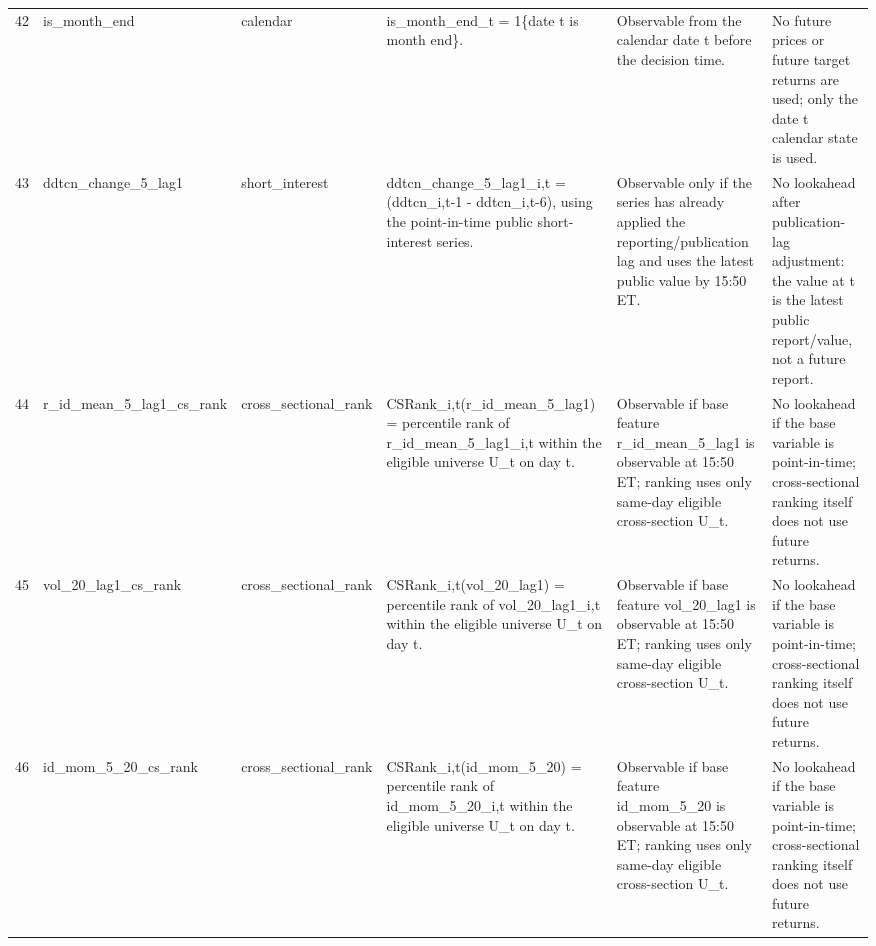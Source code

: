 \begin{landscape}
\begin{longtable}{P{0.42cm} P{2.25cm} P{2.05cm} P{5.25cm} P{4.85cm} P{5.25cm}}
42 & is\_\allowbreak{}month\_\allowbreak{}end & calendar & is\_\allowbreak{}month\_\allowbreak{}end\_\allowbreak{}t = 1\{date t is month end\}. & Observable from the calendar date t before the decision time. & No future prices or future target returns are used; only the date t calendar state is used. \\
43 & ddtcn\_\allowbreak{}change\_\allowbreak{}5\_\allowbreak{}lag1 & short\_\allowbreak{}interest & ddtcn\_\allowbreak{}change\_\allowbreak{}5\_\allowbreak{}lag1\_\allowbreak{}i,t = (ddtcn\_\allowbreak{}i,t-1 - ddtcn\_\allowbreak{}i,t-6), using the point-in-time public short-interest series. & Observable only if the series has already applied the reporting/publication lag and uses the latest public value by 15:50 ET. & No lookahead after publication-lag adjustment: the value at t is the latest public report/value, not a future report. \\
44 & r\_\allowbreak{}id\_\allowbreak{}mean\_\allowbreak{}5\_\allowbreak{}lag1\_\allowbreak{}cs\_\allowbreak{}rank & cross\_\allowbreak{}sectional\_\allowbreak{}rank & CSRank\_\allowbreak{}i,t(r\_\allowbreak{}id\_\allowbreak{}mean\_\allowbreak{}5\_\allowbreak{}lag1) = percentile rank of r\_\allowbreak{}id\_\allowbreak{}mean\_\allowbreak{}5\_\allowbreak{}lag1\_\allowbreak{}i,t within the eligible universe U\_\allowbreak{}t on day t. & Observable if base feature r\_\allowbreak{}id\_\allowbreak{}mean\_\allowbreak{}5\_\allowbreak{}lag1 is observable at 15:50 ET; ranking uses only same-day eligible cross-section U\_\allowbreak{}t. & No lookahead if the base variable is point-in-time; cross-sectional ranking itself does not use future returns. \\
45 & vol\_\allowbreak{}20\_\allowbreak{}lag1\_\allowbreak{}cs\_\allowbreak{}rank & cross\_\allowbreak{}sectional\_\allowbreak{}rank & CSRank\_\allowbreak{}i,t(vol\_\allowbreak{}20\_\allowbreak{}lag1) = percentile rank of vol\_\allowbreak{}20\_\allowbreak{}lag1\_\allowbreak{}i,t within the eligible universe U\_\allowbreak{}t on day t. & Observable if base feature vol\_\allowbreak{}20\_\allowbreak{}lag1 is observable at 15:50 ET; ranking uses only same-day eligible cross-section U\_\allowbreak{}t. & No lookahead if the base variable is point-in-time; cross-sectional ranking itself does not use future returns. \\
46 & id\_\allowbreak{}mom\_\allowbreak{}5\_\allowbreak{}20\_\allowbreak{}cs\_\allowbreak{}rank & cross\_\allowbreak{}sectional\_\allowbreak{}rank & CSRank\_\allowbreak{}i,t(id\_\allowbreak{}mom\_\allowbreak{}5\_\allowbreak{}20) = percentile rank of id\_\allowbreak{}mom\_\allowbreak{}5\_\allowbreak{}20\_\allowbreak{}i,t within the eligible universe U\_\allowbreak{}t on day t. & Observable if base feature id\_\allowbreak{}mom\_\allowbreak{}5\_\allowbreak{}20 is observable at 15:50 ET; ranking uses only same-day eligible cross-section U\_\allowbreak{}t. & No lookahead if the base variable is point-in-time; cross-sectional ranking itself does not use future returns. \\

\end{longtable}
\end{landscape}

